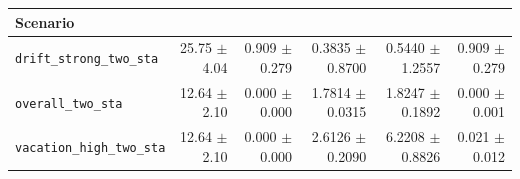 \begin{tabular}{lrrrrr}
\hline
Scenario &
 &
 &
 &
 &
 \\
\hline
\texttt{drift\_strong\_two\_sta} & 25.75 $\pm$ 4.04 & 0.909 $\pm$ 0.279 & 0.3835 $\pm$ 0.8700 & 0.5440 $\pm$ 1.2557 & 0.909 $\pm$ 0.279 \\
\texttt{overall\_two\_sta} & 12.64 $\pm$ 2.10 & 0.000 $\pm$ 0.000 & 1.7814 $\pm$ 0.0315 & 1.8247 $\pm$ 0.1892 & 0.000 $\pm$ 0.001 \\
\texttt{vacation\_high\_two\_sta} & 12.64 $\pm$ 2.10 & 0.000 $\pm$ 0.000 & 2.6126 $\pm$ 0.2090 & 6.2208 $\pm$ 0.8826 & 0.021 $\pm$ 0.012 \\
\hline
\end{tabular}
